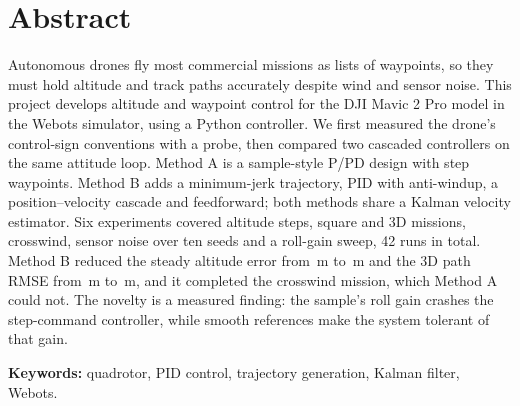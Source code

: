\section*{Abstract}
Autonomous drones fly most commercial missions as lists of waypoints, so they must hold altitude and track paths accurately despite wind and sensor noise. This project develops altitude and waypoint control for the DJI Mavic 2 Pro model in the Webots simulator, using a Python controller. We first measured the drone's control-sign conventions with a probe, then compared two cascaded controllers on the same attitude loop. Method A is a sample-style P/PD design with step waypoints. Method B adds a minimum-jerk trajectory, PID with anti-windup, a position--velocity cascade and feedforward; both methods share a Kalman velocity estimator. Six experiments covered altitude steps, square and 3D missions, crosswind, sensor noise over ten seeds and a roll-gain sweep, 42 runs in total. Method B reduced the steady altitude error from \,m to \,m and the 3D path RMSE from \,m to \,m, and it completed the crosswind mission, which Method A could not. The novelty is a measured finding: the sample's roll gain crashes the step-command controller, while smooth references make the system tolerant of that gain.

\textbf{Keywords:} quadrotor, PID control, trajectory generation, Kalman filter, Webots.
